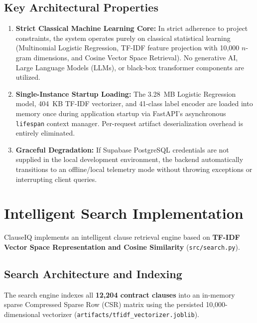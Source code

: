 \subsection{Key Architectural Properties}
\begin{enumerate}
    \item \textbf{Strict Classical Machine Learning Core:} In strict adherence to project constraints, the system operates purely on classical statistical learning (Multinomial Logistic Regression, TF-IDF feature projection with 10,000 $n$-gram dimensions, and Cosine Vector Space Retrieval). No generative AI, Large Language Models (LLMs), or black-box transformer components are utilized.
    \item \textbf{Single-Instance Startup Loading:} The 3.28~MB Logistic Regression model, 404~KB TF-IDF vectorizer, and 41-class label encoder are loaded into memory once during application startup via FastAPI's asynchronous \texttt{lifespan} context manager. Per-request artifact deserialization overhead is entirely eliminated.
    \item \textbf{Graceful Degradation:} If Supabase PostgreSQL credentials are not supplied in the local development environment, the backend automatically transitions to an offline/local telemetry mode without throwing exceptions or interrupting client queries.
\end{enumerate}

\section{Intelligent Search Implementation}
\label{sec:search_implementation}

ClauseIQ implements an intelligent clause retrieval engine based on \textbf{TF-IDF Vector Space Representation and Cosine Similarity} (\texttt{src/search.py}). 

\subsection{Search Architecture and Indexing}
The search engine indexes all \textbf{12,204 contract clauses} into an in-memory sparse Compressed Sparse Row (CSR) matrix using the persisted 10,000-dimensional vectorizer (\texttt{artifacts/tfidf\_vectorizer.joblib}). 


